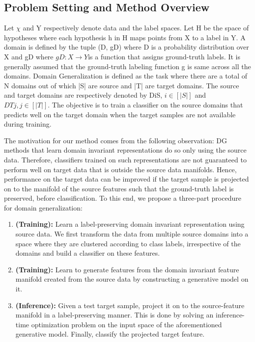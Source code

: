 \documentclass[review]{cvpr}
\begin{document}
\subsection{Problem Setting and Method Overview}
Let  $\chi$ and Y respectively denote data and the label
spaces. Let H be the space of hypotheses where each hypothesis h in H maps points from X to a label in Y. A
domain is defined by the tuple (D, gD) where D is a probability distribution over X and gD where $gD : X → Y $is
a function that assigns ground-truth labels. It is generally
assumed that the ground-truth labeling function g is same
across all the domains. Domain Generalization is defined as
the task where there are a total of N domains out of which
|S| are source and |T| are target domains. The source and
target domains are respectively denoted by DiS, $i ∈ [|S|]$
and $DTj , j ∈ [|T|].$ The objective is to train a classifier on
the source domains that predicts well on the target domain
when the target samples are not available during training. \par
The motivation for our method comes from the following observation: DG methods that learn domain invariant
representations do so only using the source data. Therefore,
classifiers trained on such representations are not guaranteed to perform well on target data that is outside the source
data manifolds. Hence, performance on the target data can
be improved if the target sample is projected on to the manifold of the source features such that the ground-truth label
is preserved, before classification. To this end, we propose
a three-part procedure for domain generalization: \\

\begin{enumerate}
    \item \textbf{(Training):} Learn a label-preserving domain invariant
representation using source data. We first transform the data
from multiple source domains into a space where they are
clustered according to class labels, irrespective of the domains and build a classifier on these features.
 \item \textbf{(Training):} Learn to generate features from the domain
invariant feature manifold created from the source data by
constructing a generative model on it.
 \item \textbf{(Inference):} Given a test target sample, project it on
to the source-feature manifold in a label-preserving manner. This is done by solving an inference-time optimization
problem on the input space of the aforementioned generative model. Finally, classify the projected target feature.
\end{enumerate}
\end{document}
